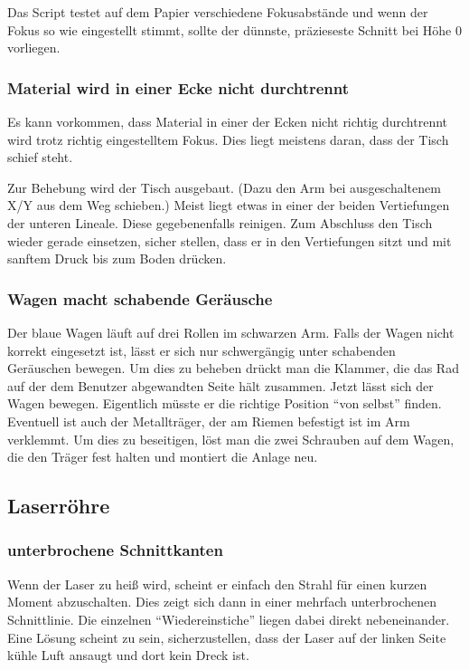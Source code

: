 \documentclass{\basedir/fablab-document}
\begin{document}
Das Script testet auf dem Papier verschiedene Fokusabstände und wenn der Fokus so wie eingestellt stimmt, sollte der dünnste, präzieseste Schnitt bei Höhe 0 vorliegen.


\subsubsection{Material wird in einer Ecke nicht durchtrennt}
Es kann vorkommen, dass Material in einer der Ecken nicht richtig durchtrennt wird trotz richtig eingestelltem Fokus. Dies liegt meistens daran, dass der Tisch schief steht.

Zur Behebung wird der Tisch ausgebaut. (Dazu den Arm bei ausgeschaltenem X/Y aus dem Weg schieben.) Meist liegt etwas in einer der beiden Vertiefungen der unteren Lineale. Diese gegebenenfalls reinigen. Zum Abschluss den Tisch wieder gerade einsetzen, sicher stellen, dass er in den Vertiefungen sitzt und mit sanftem Druck bis zum Boden drücken.

\subsubsection{Wagen macht schabende Geräusche}
Der blaue Wagen läuft auf drei Rollen im schwarzen Arm. Falls der Wagen nicht korrekt eingesetzt ist, lässt er sich nur schwergängig unter schabenden Geräuschen bewegen. Um dies zu beheben drückt man die Klammer, die das Rad auf der dem Benutzer abgewandten Seite hält zusammen. Jetzt lässt sich der Wagen bewegen. Eigentlich müsste er die richtige Position \enquote{von selbst} finden. Eventuell ist auch der Metallträger, der am Riemen befestigt ist im Arm verklemmt. Um dies zu beseitigen, löst man die zwei Schrauben auf dem Wagen, die den Träger fest halten und montiert die Anlage neu.

\subsection{Laserröhre}
\subsubsection{unterbrochene Schnittkanten}
Wenn der Laser zu heiß wird, scheint er einfach den Strahl für einen kurzen Moment abzuschalten. Dies zeigt sich dann in einer mehrfach unterbrochenen Schnittlinie. Die einzelnen \enquote{Wiedereinstiche} liegen dabei direkt nebeneinander. Eine Lösung scheint zu sein, sicherzustellen, dass der Laser auf der linken Seite kühle Luft ansaugt und dort kein Dreck ist.
\end{document}
